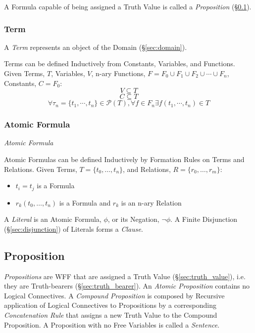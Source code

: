 A Formula capable of being assigned a Truth Value is called a
\emph{Proposition} (\S\ref{sec:proposition}).



\subsubsection{Term}\label{sec:term}

A \emph{Term} represents an object of the Domain (\S\ref{sec:domain}).

Terms can be defined Inductively from Constants, Variables, and
Functions. Given Terms, $T$, Variables, $V$, n-ary Functions, $F = F_0
\cup F_1 \cup F_2 \cup \cdots \cup F_n$, Constants, $C = F_0$:
\[
    V \subseteq T
\]\[
    C \subseteq T
\]\[
    \forall \tau_n=\{t_1,\cdots,t_n\} \in \mathcal{P}(T), \forall f
    \in F_n \exists f(t_1,\cdots,t_n) \in T
\]



\subsubsection{Atomic Formula}\label{sec:atomic_formula}

\emph{Atomic Formula}

Atomic Formulas can be defined Inductively by Formation Rules on Terms
and Relations. Given Terms, $T = \{t_0,\ldots,t_n\}$, and Relations,
$R = \{r_0,\ldots,r_m\}$:
\begin{itemize}
\item $t_i = t_j$ is a Formula
\item $r_k(t_0,\ldots,t_n)$ is a Formula and $r_k$ is an n-ary Relation
\end{itemize}
A \emph{Literal} is an Atomic Formula, $\phi$, or its Negation, $\neg
\phi$. A Finite Disjunction (\S\ref{sec:disjunction}) of Literals
forms a \emph{Clause}.



\subsection{Proposition}\label{sec:proposition}

\emph{Propositions} are WFF that are assigned a Truth Value
(\S\ref{sec:truth_value}), i.e. they are Truth-bearers
(\S\ref{sec:truth_bearer}). An \emph{Atomic Proposition} contains no
Logical Connectives. A \emph{Compound Proposition} is composed by
Recursive application of Logical Connectives to Propositions by a
corresponding \emph{Concatenation Rule} that assigns a new Truth Value
to the Compound Proposition. A Proposition with no Free Variables is
called a \emph{Sentence}.


